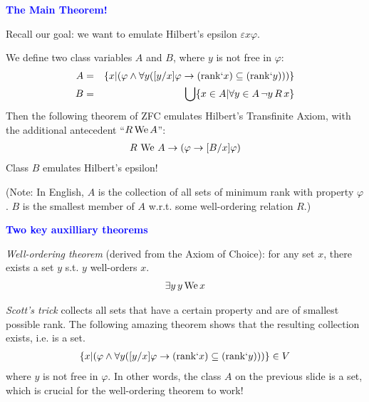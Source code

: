 \documentclass{slides}
\begin{document}
\begin{slide}


\begin{center}
\textcolor{blue}{\textbf{The Main Theorem!}}
\end{center}

Recall our goal:  we want to emulate Hilbert's epsilon $\varepsilon x
\varphi$.

We define two class variables $A$ and $B$,
where $y$ is not free in $\varphi$:
\begin{eqnarray}
 A & = & \{ x | ( \varphi \wedge \forall y ( [ y / x ] \varphi \rightarrow (
{\rm rank} ` x ) \subseteq ( {\rm rank} ` y ) ) ) \} \\
B & = & \bigcup \{ x \in A | \forall y \in A \,\lnot y \,R \,x \}
\end{eqnarray}
Then the following theorem of ZFC emulates Hilbert's Transfinite
Axiom, with the additional antecedent ``$R \,{\rm We}\, A$'':
\begin{eqnarray}
  R \,\,{\rm We}\,\, A \rightarrow ( \varphi \rightarrow [ B / x ] \varphi )
    \label{hta}
\end{eqnarray}
Class $B$ emulates Hilbert's epsilon!

\small{(Note: In English,
$A$ is the collection of all sets of minimum rank
with property $\varphi$.  $B$ is the smallest member of $A$ w.r.t.
some well-ordering relation $R$.)}


\end{slide}

\begin{slide}

\begin{center}
\textcolor{blue}{\textbf{Two key auxilliary theorems}}
\end{center}

{\em Well-ordering theorem} (derived from the Axiom of Choice):  for any
set $x$, there exists a set $y$ s.t. $y$ well-orders $x$.
\begin{eqnarray}
\exists y \,y \,{\rm We}\, x  \label{weth}
\end{eqnarray}


{\em Scott's trick} collects all sets that have a certain property and are of
smallest possible rank.  The following amazing
theorem shows that the resulting
collection exists, i.e. is a set.
\begin{eqnarray}
 \{ x | ( \varphi \wedge \forall y ( [ y / x ] \varphi \rightarrow (
{\rm rank} ` x ) \subseteq ( {\rm rank} ` y ) ) ) \} \in V  \label{scottexs}
\end{eqnarray}
where $y$ is not free in $\varphi$.  In other words, the class $A$
on the previous slide is a set, which is crucial for the well-ordering
theorem to work!


\end{slide}
\end{document}
